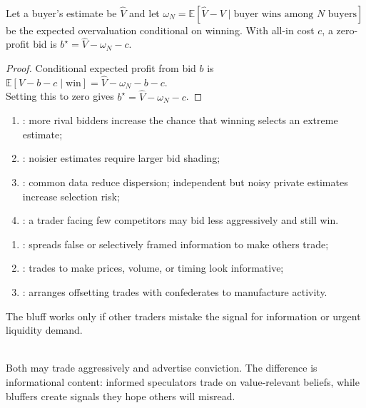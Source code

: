 \documentclass[a4paper,oneside,openany]{book}
\begin{document}
\begin{proposition} \\
Let a buyer's estimate be $\widehat{V}$ and let $\omega_N=\mathbb{E}[\widehat{V}-V\mid\text{buyer wins among }N\text{ buyers}]$ be the expected overvaluation conditional on winning. With all-in cost $c$, a zero-profit bid is $b^\star=\widehat{V}-\omega_N-c$.
\begin{proof}
Conditional expected profit from bid $b$ is $\mathbb{E}[V-b-c\mid\text{win}]=\widehat{V}-\omega_N-b-c$.\\
Setting this to zero gives $b^\star=\widehat{V}-\omega_N-c$.
\end{proof}
\end{proposition}

\begin{taxonomy} 
\begin{enumerate}[label=\roman*.]
\setlength{\itemsep}{0pt}
\item {}: more rival bidders increase the chance that winning selects an extreme estimate;
\item {}: noisier estimates require larger bid shading;
\item {}: common data reduce dispersion; independent but noisy private estimates increase selection risk;
\item {}: a trader facing few competitors may bid less aggressively and still win.
\end{enumerate}
\end{taxonomy}

\begin{taxonomy} 
\begin{enumerate}[label=\roman*.]
\setlength{\itemsep}{0pt}
\item {}: spreads false or selectively framed information to make others trade;
\item {}: trades to make prices, volume, or timing look informative;
\item {}: arranges offsetting trades with confederates to manufacture activity.
\end{enumerate}
The bluff works only if other traders mistake the signal for information or urgent liquidity demand.
\end{taxonomy}

\begin{principle} \\
Both may trade aggressively and advertise conviction. The difference is informational content: informed speculators trade on value-relevant beliefs, while bluffers create signals they hope others will misread.
\end{principle}
\end{document}
